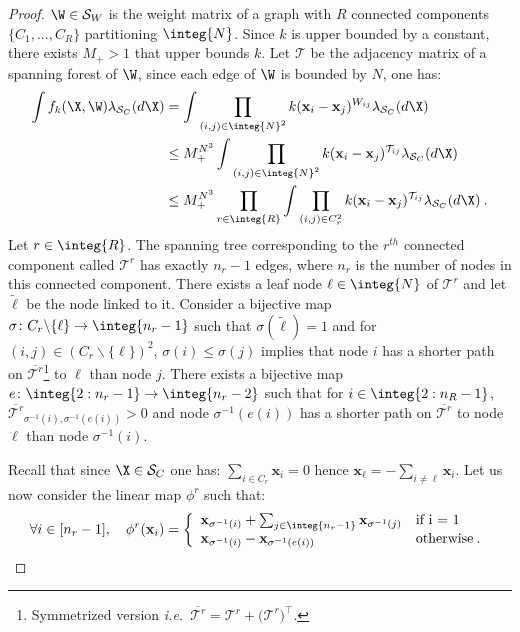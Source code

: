 \begin{proof}
$\W \in \mathcal{S}_W$ is the weight matrix of a graph with $R$ connected components $\{C_1, ..., C_R\}$ partitioning $\integ{N}$. Since $k$ is upper bounded by a constant, there exists $M_+ > 1$ that upper bounds $k$. Let $\bm{\mathcal{T}}$ be the adjacency matrix of a spanning forest of $\W$, since each edge of $\W$ is bounded by $N$, one has:
\begin{align}
    \int f_{k}(\X, \W) \lambda_{\mathcal{S}_{C}}(d\X) &= \int \prod_{(i,j) \in \integ{N}^2} k(\mathbf{x}_{i} - \mathbf{x}_{j})^{W_{ij}} \lambda_{\mathcal{S}_{C}}(d\X) \nonumber \\
    &\leq M_+^{N^{3}} \int \prod_{(i,j) \in \integ{N}^2} k(\mathbf{x}_{i} - \mathbf{x}_{j})^{\mathcal{T}_{ij}} \lambda_{\mathcal{S}_{C}}(d\X) \nonumber \\
    &\leq M_+^{N^{3}} \prod_{r \in \integ{R}} \int \prod_{(i,j) \in C_{r}^2} k(\mathbf{x}_{i} - \mathbf{x}_{j})^{\mathcal{T}_{ij}} \lambda_{\mathcal{S}_{C}}(d\X) \:. \label{bound_MRF_product_CC}
\end{align}
Let $r \in \integ{R}$. The spanning tree corresponding to the $r^{th}$ connected component called $\bm{\mathcal{T}}^r$ has exactly $n_r-1$ edges, where $n_r$ is the number of nodes in this connected component. There exists a leaf node $\ell \in \integ{N}$ of $\bm{\mathcal{T}}^r$ and let $\tilde{\ell}$ be the node linked to it. Consider a bijective map $\sigma \colon C_r \backslash \{\ell\} \to \integ{n_r - 1}$ such that $\sigma(\tilde{\ell}) = 1$ and for $(i,j) \in (C_r \backslash \{\ell\})^2$, $\sigma(i) \leq \sigma(j)$ implies that node $i$ has a shorter path on $\overline{\bm{\mathcal{T}}^r}$\footnote{Symmetrized version \textit{i.e.}\ $\overline{\bm{\mathcal{T}}^r} = \bm{\mathcal{T}}^r + \bm{(\mathcal{T}}^r)^\top$.} to $\ell$ than node $j$. There exists a bijective map $e \colon \integ{2:n_r - 1} \to \integ{n_r - 2}$ such that for $i \in \integ{2:n_R-1}$, $\overline{\bm{\mathcal{T}}^r}_{\sigma^{-1}(i), \sigma^{-1}(e(i))} > 0$ and node $\sigma^{-1}(e(i))$ has a shorter path on $\overline{\bm{\mathcal{T}}^r}$ to node $\ell$ than node $\sigma^{-1}(i)$.

Recall that since $\X \in \mathcal{S}_{C}$ one has: $\sum_{i \in C_r} \mathbf{x}_i = 0$ hence $\mathbf{x}_{\ell} = - \sum_{i \neq \ell} \mathbf{x}_i$. Let us now consider the linear map $\phi^r$ such that:
\begin{align*}
\forall i \in [n_r - 1], \quad \phi^r(\mathbf{x}_i) = \left\{
    \begin{array}{ll}
        \mathbf{x}_{\sigma^{-1}(i)} + \sum_{j \in \integ{n_r - 1}} \mathbf{x}_{\sigma^{-1}(j)} & \mbox{if i = 1}\\
        \mathbf{x}_{\sigma^{-1}(i)} - \mathbf{x}_{\sigma^{-1}(e(i))} & \mbox{otherwise} \:.
    \end{array}
\right.
\end{align*}


\end{proof}
